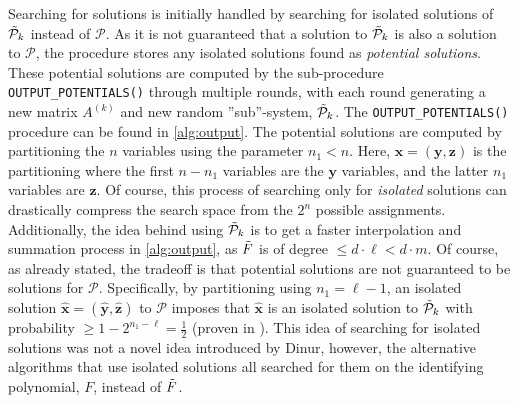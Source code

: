 Searching for solutions is initially handled by searching for isolated solutions of $\Tilde{\mathcal{P}}_k$ instead of $\mathcal{P}$. As it is not guaranteed that a solution to $\Tilde{\mathcal{P}}_k$ is also a solution to $\mathcal{P}$, the procedure stores any isolated solutions found as \textit{potential solutions}. These potential solutions are computed by the sub-procedure \texttt{OUTPUT\_POTENTIALS()} through multiple rounds, with each round generating a new matrix $A^{(k)}$ and new random ''sub''-system, $\Tilde{\mathcal{P}}_k$. The \texttt{OUTPUT\_POTENTIALS()} procedure can be found in \cref{alg:output}. The potential solutions are computed by partitioning the $n$ variables using the parameter $n_1 < n$. Here, $\mathbf{x} = (\mathbf{y}, \mathbf{z})$ is the partitioning where the first $n - n_1$ variables are the $\mathbf{y}$ variables, and the latter $n_1$ variables are $\mathbf{z}$. Of course, this process of searching only for \textit{isolated} solutions can drastically compress the search space from the $2^n$ possible assignments. Additionally, the idea behind using $\Tilde{\mathcal{P}}_k$ is to get a faster interpolation and summation process in \cref{alg:output}, as $\Tilde{F}$ is of degree $ \leq d \cdot \ell < d \cdot m$. Of course, as already stated, the tradeoff is that potential solutions are not guaranteed to be solutions for $\mathcal{P}$. Specifically, by partitioning using $n_1 = \ell - 1$, an isolated solution $\hat{\mathbf{x}} = (\mathbf{\hat{y}}, \mathbf{\hat{z}})$ to $\mathcal{P}$ imposes that $\hat{\mathbf{x}}$ is an isolated solution to $\Tilde{\mathcal{P}}_k$ with probability $\geq 1 - 2^{n_1 - \ell} = \frac{1}{2}$ (proven in \cite{eurocrypt-2021-30841}). This idea of searching for isolated solutions was not a novel idea introduced by Dinur, however, the alternative algorithms that use isolated solutions all searched for them on the identifying polynomial, $F$, instead of $\Tilde{F}$.


